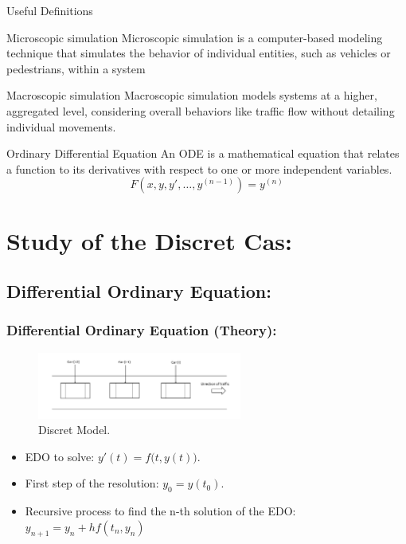 \documentclass{beamer}
\begin{document}
\begin{frame}{Useful Definitions}
	\vspace{-0.2cm}
	\begin{block}{Microscopic simulation}
		Microscopic simulation is a computer-based modeling technique that simulates the behavior of individual entities, such as vehicles or pedestrians, within a system
	\end{block}
	\vspace{-0.2cm}
	\begin{block}{Macroscopic simulation}
		Macroscopic simulation models systems at a higher, aggregated level, considering overall behaviors like traffic flow without detailing individual movements.
	\end{block}
	\vspace{-0.2cm}
	\begin{block}{Ordinary Differential Equation}
		An ODE is a mathematical equation that relates a function to its derivatives with respect to one or more independent variables.
		\[
		F\left(x,y,y',\ldots ,y^{(n-1)}\right)=y^{(n)}
		\]
	\end{block}
\end{frame}

\section{Study of the Discret Cas:}

\begin{frame}
\subsection{Differential Ordinary Equation:}
\frametitle{Differential Ordinary Equation (Theory):}
\begin{figure}
    \centering
    \includegraphics[width=0.6\textwidth]{discret.png} 
    \caption{ Discret Model.}
\end{figure}
    \begin{itemize}
			\item EDO to solve: $\boxed{y'(t) = f{\bigl (}t, y(t){\bigr )}}$.
			\item First step of the resolution: $\boxed{y_0 = y(t_0)}$.
			\item Recursive process to find the n-th solution of the EDO: $\boxed{y_{n+1} = y_{n} + hf(t_{n}, y_{n})}$
		\end{itemize}
\end{frame}
\end{document}

